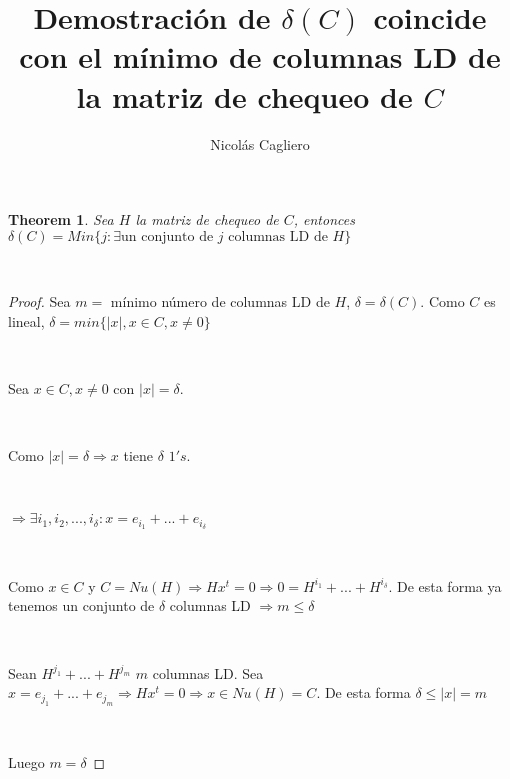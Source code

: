 \documentclass[11pt]{article}
\title{Demostración de $\delta(C)$ coincide con el mínimo de columnas LD de la matriz de chequeo de $C$}
\author{Nicolás Cagliero}
\newtheorem{theorem}{Theorem}
\begin{document}
\maketitle
\begin{theorem} Sea $H$ la matriz de chequeo de $C$, entonces $\delta(C) = Min\{j: \exists \text{un conjunto de $j$ columnas LD de $H$}\}$\par
\

\end{theorem}

\begin{proof} Sea $m =$ mínimo número de columnas LD de $H$, $\delta = \delta(C)$. Como $C$ es lineal, $\delta = min\{|x|, x \in C, x \ne 0 \}$\par
\

Sea $x \in C, x \ne 0$ con $|x| = \delta$.\par
\

Como $|x| = \delta \Rightarrow x$ tiene $\delta$  $1's$. \par
\

$\Rightarrow \exists i_1, i_2, ..., i_{\delta}: x = e_{i_1} + ... + e_{i_{\delta}}$\par
\

Como $x \in C$ y $C = Nu(H) \Rightarrow Hx^{t} = 0 \Rightarrow 0 = H^{i_1} + ... + H^{i_{\delta}}$. De esta forma ya tenemos un conjunto de $\delta$ columnas LD $\Rightarrow m \le \delta$\par
\

Sean $H^{j_1} + ... + H^{j_{m}}$  $m$ columnas LD. Sea $x = e_{j_1} + ... + e_{j_m} \Rightarrow Hx^t = 0 \Rightarrow x \in Nu(H) = C$. De esta forma $\delta \le |x| = m$ \par
\

Luego $m = \delta$


\end{proof}
\end{document}
